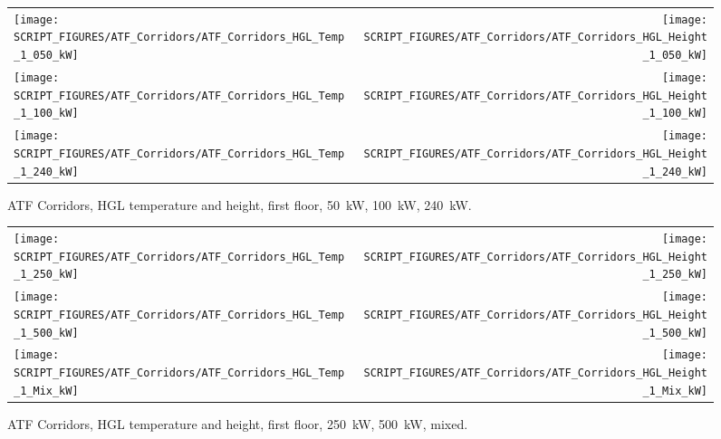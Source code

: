 \begin{figure}[!ht]
\begin{tabular*}{\textwidth}{l@{\extracolsep{\fill}}r}
\texttt{[image: SCRIPT\_FIGURES/ATF\_Corridors/ATF\_Corridors\_HGL\_Temp\_1\_050\_kW]} &
\texttt{[image: SCRIPT\_FIGURES/ATF\_Corridors/ATF\_Corridors\_HGL\_Height\_1\_050\_kW]} \\
\texttt{[image: SCRIPT\_FIGURES/ATF\_Corridors/ATF\_Corridors\_HGL\_Temp\_1\_100\_kW]} &
\texttt{[image: SCRIPT\_FIGURES/ATF\_Corridors/ATF\_Corridors\_HGL\_Height\_1\_100\_kW]} \\
\texttt{[image: SCRIPT\_FIGURES/ATF\_Corridors/ATF\_Corridors\_HGL\_Temp\_1\_240\_kW]} &
\texttt{[image: SCRIPT\_FIGURES/ATF\_Corridors/ATF\_Corridors\_HGL\_Height\_1\_240\_kW]}
\end{tabular*}
\caption[ATF Corridors, HGL temperature and height, first floor, 50~kW, 100~kW, 240~kW]
{ATF Corridors, HGL temperature and height, first floor, 50~kW, 100~kW, 240~kW.}
\label{ATF_Corridors_HGL_1}
\end{figure}

\newpage

\begin{figure}[p]
\begin{tabular*}{\textwidth}{l@{\extracolsep{\fill}}r}
\texttt{[image: SCRIPT\_FIGURES/ATF\_Corridors/ATF\_Corridors\_HGL\_Temp\_1\_250\_kW]} &
\texttt{[image: SCRIPT\_FIGURES/ATF\_Corridors/ATF\_Corridors\_HGL\_Height\_1\_250\_kW]} \\
\texttt{[image: SCRIPT\_FIGURES/ATF\_Corridors/ATF\_Corridors\_HGL\_Temp\_1\_500\_kW]} &
\texttt{[image: SCRIPT\_FIGURES/ATF\_Corridors/ATF\_Corridors\_HGL\_Height\_1\_500\_kW]} \\
\texttt{[image: SCRIPT\_FIGURES/ATF\_Corridors/ATF\_Corridors\_HGL\_Temp\_1\_Mix\_kW]} &
\texttt{[image: SCRIPT\_FIGURES/ATF\_Corridors/ATF\_Corridors\_HGL\_Height\_1\_Mix\_kW]}
\end{tabular*}
\caption[ATF Corridors, HGL temperature and height, first floor, 250~kW, 500~kW, mixed]
{ATF Corridors, HGL temperature and height, first floor, 250~kW, 500~kW, mixed.}
\label{ATF_Corridors_HGL_2}
\end{figure}

